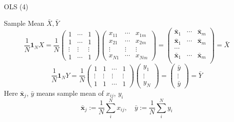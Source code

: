 \documentclass[a4paper,11pt]{article}
\newcommand{\bd}{\mathbf}
\begin{document}
\begin{frame}[t]{OLS (4)}
	\begin{block}
		{Sample Mean $\bar X, \bar Y$}
		\[
			\frac{1}{N}\bd{1}_N X = \frac{1}{N}\begin{pmatrix}
				1  & \cdots & 1\\
				1  & \cdots & 1\\
				\vdots & \vdots & \vdots\\
				1 & \cdots & 1
			\end{pmatrix}\begin{pmatrix}
			x_{11} & \cdots & x_{1m}\\
			x_{21} & \cdots & x_{2m}\\
			\vdots & \vdots & \vdots\\
			x_{N1} & \cdots & x_{Nm}
		\end{pmatrix} = \begin{pmatrix}
			\bar{\bd{x}}_1 & \cdots & \bar{\bd{x}}_m\\
			\bar{\bd{x}}_1 & \cdots & \bar{\bd{x}}_m\\
			\cdots\\
			\bar{\bd{x}}_1 & \cdots & \bar{\bd{x}}_m\\
		\end{pmatrix}= \bar{X}
		\]
		\[
			\frac{1}{N}\bd{1}_N Y = \frac{1}{N}\begin{pmatrix}
				1 & 1 & \cdots & 1\\
				\vdots & \vdots & \vdots & \vdots\\
				1 & 1 & \cdots & 1
			\end{pmatrix}\begin{pmatrix}
			y_1 \\
			\vdots\\
			y_N
		\end{pmatrix} = \begin{pmatrix}
			\bar{y}\\
			\vdots\\
			\bar{y}
		\end{pmatrix}=\bar{Y}
		\]
		Here $\bar{\bd{x}}_j$, $\bar{y}$ means sample mean of $x_{ij}$, $y_i$\[
			\bar{\bd{x}}_j := \frac{1}{N}\sum_i^N x_{ij}, \quad \bar{y}:=\frac{1}{N}\sum_i^N {y_i}
		\]
	\end{block}
\end{frame}
\end{document}
